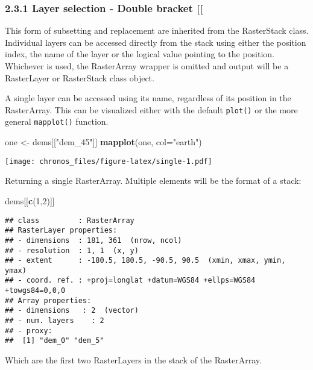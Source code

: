 \documentclass[]{article}
\newenvironment{Shaded}{\begin{snugshade}}{\end{snugshade}}
\newcommand{\KeywordTok}[1]{\textcolor[rgb]{0.13,0.29,0.53}{\textbf{#1}}}
\newcommand{\DataTypeTok}[1]{\textcolor[rgb]{0.13,0.29,0.53}{#1}}
\newcommand{\DecValTok}[1]{\textcolor[rgb]{0.00,0.00,0.81}{#1}}
\newcommand{\StringTok}[1]{\textcolor[rgb]{0.31,0.60,0.02}{#1}}
\newcommand{\NormalTok}[1]{#1}
\begin{document}
\subsubsection{2.3.1 Layer selection - Double bracket
{[}{[}}\label{layer-selection---double-bracket}

This form of subsetting and replacement are inherited from the
RasterStack class. Individual layers can be accessed directly from the
stack using either the position index, the name of the layer or the
logical value pointing to the position. Whichever is used, the
RasterArray wrapper is omitted and output will be a RasterLayer or
RasterStack class object.

A single layer can be accessed using its name, regardless of its
position in the RasterArray. This can be visualized either with the
default \texttt{plot()} or the more general \texttt{mapplot()} function.

\begin{Shaded}
\begin{Highlighting}[]
\NormalTok{one <-}\StringTok{ }\NormalTok{dems[[}\StringTok{"dem_45"}\NormalTok{]]}
\KeywordTok{mapplot}\NormalTok{(one, }\DataTypeTok{col=}\StringTok{"earth"}\NormalTok{)}
\end{Highlighting}
\end{Shaded}

\texttt{[image: chronos\_files/figure-latex/single-1.pdf]}

Returning a single RasterArray. Multiple elements will be the format of
a stack:

\begin{Shaded}
\begin{Highlighting}[]
\NormalTok{dems[[}\KeywordTok{c}\NormalTok{(}\DecValTok{1}\NormalTok{,}\DecValTok{2}\NormalTok{)]]}
\end{Highlighting}
\end{Shaded}

\begin{verbatim}
## class         : RasterArray 
## RasterLayer properties: 
## - dimensions  : 181, 361  (nrow, ncol)
## - resolution  : 1, 1  (x, y)
## - extent      : -180.5, 180.5, -90.5, 90.5  (xmin, xmax, ymin, ymax)
## - coord. ref. : +proj=longlat +datum=WGS84 +ellps=WGS84 +towgs84=0,0,0 
## Array properties: 
## - dimensions   : 2  (vector)
## - num. layers    : 2
## - proxy:
##  [1] "dem_0" "dem_5"
\end{verbatim}

Which are the first two RasterLayers in the stack of the RasterArray.
\end{document}
